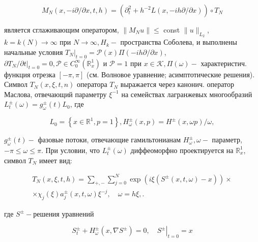 \documentclass[10pt]{article}
\begin{document}
\[

M_{N}(x,-i \partial / \partial x, t, h)=\left(\partial_{t}^{2}+h^{-2} L(x,-i h \partial / \partial x)\right) \circ T_{N}

\]



является сглаживающим оператором, $\left\|M_{N} u\right\| \leqslant$ const $\|u\|_{L_{2}}$, $k=k(N) \rightarrow \infty$ при $N \rightarrow \infty, H_{k}-$ пространства Соболева, и выполнены начальные условия $\left.T_{N}\right|_{t=0}=\mathscr{P}(x) \Pi(-i h \partial / \partial x)$, $\partial T_{N} /\left.\partial t\right|_{t=0}=0, \mathscr{P} \in C_{0}^{\infty}\left(\mathbb{R}_{x}^{1}\right)$ и $\mathscr{P}=1$ при $x \in \mathscr{K}, \Pi(\omega)-$ характеристич. функция отрезка $[-\pi, \pi]$ (см. Волновое уравнение; асимптотические решения). Символ $T_{N}(x, \xi, t, n)$ оператора $T_{N}$ выражается через канонич. оператор Маслова, отвечающий параметру $\xi^{-1}$ на семействах лагранжевых многообразий $L_{t}^{ \pm}(\omega)=g_{\omega}^{ \pm}(t) L_{0}$, где



\[

L_{0}=\left\{x \in \mathbb{R}^{1}, p=1\right\}, H_{\omega}^{ \pm}(x, p)=H^{ \pm}(x, \omega p) / \omega,

\]



$g_{\omega}^{ \pm}(t)-$ фазовые потоки, отвечающие гамильтонианам $H_{\omega}^{ \pm}, \omega-$ параметр, $-\pi \leqslant \omega \leqslant \pi$. При условии, что $L_{t}^{ \pm}(\omega)$ диффеоморфно проектируется на $\mathbb{R}_{x}^{1}$, символ $T_{N}$ имеет вид:



\[

\begin{gathered}

T_{N}(x, \xi, t, h)=\sum_{+,-} \sum_{j=0}^{N} \exp \left(i \xi\left(S^{ \pm}(x, t, \omega)-x\right)\right) \times \\

\times \chi_{j}(\xi) a_{j}^{ \pm}(x, t, \omega) \xi^{-j}, \quad \omega=h \xi, .

\end{gathered}

\]



где $S^{ \pm}-$решения уравнений



\[

S_{t}^{ \pm}+H_{\omega}^{ \pm}\left(x, \nabla S^{ \pm}\right)=0,\left.\quad S^{ \pm}\right|_{t=0}=x

\]
\end{document}
